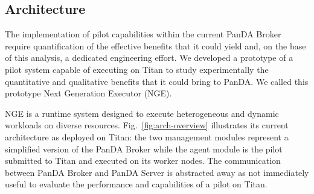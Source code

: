 

\subsection{Architecture}
\label{sec:arch}

The implementation of pilot capabilities within the current PanDA Broker require
quantification of the effective benefits that it could yield and, on the base of
this analysis, a dedicated engineering effort. We developed a prototype of a
pilot system capable of executing on Titan to study experimentally the
quantitative and qualitative benefits that it could bring to PanDA. We called
this prototype Next Generation Executor (NGE).


NGE is a runtime system designed to execute heterogeneous and dynamic workloads
on diverse resources. Fig.~\ref{fig:arch-overview} illustrates its current
architecture as deployed on Titan: the two management modules represent a
simplified version of the PanDA Broker while the agent module is the pilot
submitted to Titan and executed on its worker nodes. The communication between
PanDA Broker and PanDA Server is abstracted away as not immediately useful to
evaluate the performance and capabilities of a pilot on Titan.


